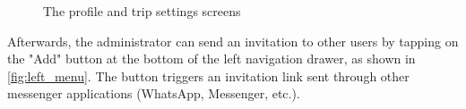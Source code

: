 \documentclass[11pt,a4paper,oneside]{article}
\begin{document}
\begin{figure}[H]
    \centering
    \qquad
    \qquad
    \caption{The profile and trip settings screens }%
    \label{fig:profile_trip_settings}%
\end{figure}

Afterwards, the administrator can send an invitation to other users by tapping on the "Add" button at the bottom of the left navigation drawer, as shown in \autoref{fig:left_menu}. The button triggers an invitation link sent through other messenger applications (WhatsApp, Messenger, etc.).
\end{document}
